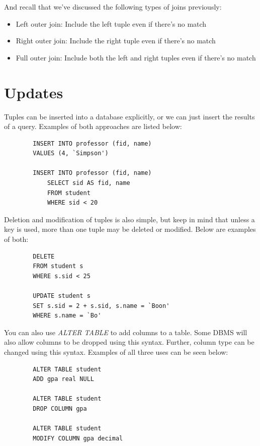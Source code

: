\documentclass{article}
\begin{document}
And recall that we've discussed the following types of joins previously:
\begin{itemize}
    \item Left outer join: Include the left tuple even if there's no match
    \item Right outer join: Include the right tuple even if there's no match
    \item Full outer join: Include both the left and right tuples even if there's no match
\end{itemize}

\section*{Updates}
Tuples can be inserted into a database explicitly, or we can just insert the results of a query. Examples of both approaches are listed below:

\begin{tcolorbox}
    \begin{verbatim}
        INSERT INTO professor (fid, name)
        VALUES (4, `Simpson')

        INSERT INTO professor (fid, name)
            SELECT sid AS fid, name
            FROM student
            WHERE sid < 20
    \end{verbatim}
\end{tcolorbox}

Deletion and modification of tuples is also simple, but keep in mind that unless a key is used, more than one tuple may be deleted or modified. Below are examples of both:

\begin{tcolorbox}
    \begin{verbatim}
        DELETE
        FROM student s
        WHERE s.sid < 25

        UPDATE student s
        SET s.sid = 2 + s.sid, s.name = `Boon'
        WHERE s.name = `Bo'
    \end{verbatim}
\end{tcolorbox}

You can also use \textit{ALTER TABLE} to add columns to a table. Some DBMS will also allow columns to be dropped using this syntax. Further, column type can be changed using this syntax. Examples of all three uses can be seen below:

\begin{tcolorbox}
    \begin{verbatim}
        ALTER TABLE student
        ADD gpa real NULL

        ALTER TABLE student
        DROP COLUMN gpa

        ALTER TABLE student
        MODIFY COLUMN gpa decimal
    \end{verbatim}
\end{tcolorbox}
\end{document}
